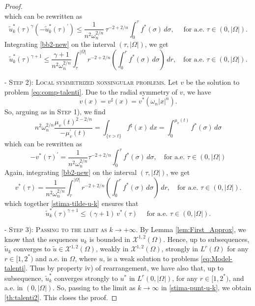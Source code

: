 \documentclass[10pt,a4paper]{amsart}
\def \XX {\mathcal{X}}
\begin{document}
\begin{proof}
$$$$
which can be rewritten as 
\begin{equation}\label{bb2-new}
\tilde{u}_k^\ast(\tau)^\gamma\left(-\tilde{u}_k^\ast(\tau)^{\prime}\right) \leq \frac{1}{n^2 \omega_n^{2 / n}} \,\tau^{-2+2 / n} \int_0^\tau f^\ast(\sigma) \,d\sigma, \quad \text { for a.e. } \tau \in(0,|\Omega|).
\end{equation}
Integrating \eqref{bb2-new} on the interval $(\tau,|\Omega|)$, we get
\begin{equation}\label{stima-tilde-u-k}
\tilde{u}_k^\ast(\tau)^{\gamma+1} \leq \frac{\gamma+1}{n^2 \omega_n^{2 / n}} \int_\tau^{|\Omega|} r^{-2+2 / n}\left(\int_0^r f^\ast(\sigma) \,d \sigma\right) \,d r, \quad\text{for a.e. } \tau\in(0,|\Omega|).
\end{equation}

-\,\,\textsc{Step 2): Local symmetrized nonsingular problems.} Let $v$ be the solution to problem \eqref{eq:comp-talenti}. Due to the radial symmetry of $v$, we have 
$$v(x)=v^\sharp(x)=v^*(\omega_n|x|^n).$$
So, arguing as in \textsc{Step 1)}, we find
\begin{equation*}
n^2 \omega_n^{2 / n} \dfrac{\mu_{v}(t)^{2-2/n}}{-\mu_{v}^{\prime}(t)} =\int_{\{v>t\}} f^\sharp(x)\,d x=\int_0^{\mu_v(t)}f^\ast(\sigma)\, d\sigma
\end{equation*}
which can be rewritten as
$$
-v^\ast(\tau)^{\prime} =\frac{1}{n^2 \omega_n^{2 / n}} \tau^{-2+2 / n} \int_0^\tau f^\ast(\sigma) \,d\sigma, \quad \text {for a.e. } \tau \in(0,|\Omega|)
$$
Again, integrating \eqref{bb2-new} on the interval $(\tau,|\Omega|)$, we get
\begin{equation}\label{eq-v}
v^\ast(\tau)= \frac{1}{n^2 \omega_n^{2 / n}} \int_\tau^{|\Omega|} r^{-2+2 / n}\left(\int_0^r f^\ast(\sigma) \,d \sigma\right) \,d r, \quad\text{for a.e. } \tau\in(0,|\Omega|).
\end{equation}
which together \eqref{stima-tilde-u-k} ensures that 
\begin{equation}\label{stima-punt-u-k}
    \tilde u_k^\ast(\tau)^{\gamma+1}\leq (\gamma+1)\,v^\ast(\tau)\quad \text{ for a.e. }\tau \in(0,|\Omega|).
\end{equation}

-\,\,\textsc{Step 3): Passing to the limit as $k \to +\infty$.} By Lemma \ref{lem:First_Approx}, we know that the sequences $u_k$ is bounded in $\XX^{1,2}(\Omega)$. Hence, up to subsequences, $\tilde u_k$ converges to $\tilde u \in \XX^{1,2}(\Omega)$, weakly in $\XX^{1,2}(\Omega)$, strongly in $L^r(\Omega)$ for any $r\in [1,2^\ast)$ and a.e. in $\Omega$, where $u$, is a weak solution to problems \eqref{eq:Model-talenti}. Thus by property iv) of rearrangement, we have also that, up to subsequence, $\tilde u_k^\ast$ converges strongly to $u^\ast$ in $L^r(0,|\Omega|)$, for any $r\in[1,2^\ast)$, and a.e. in $(0,|\Omega|).$ So, passing to the limit as $k\to\infty$ in \eqref{stima-punt-u-k}, we obtain \eqref{th:talenti2}. This closes the proof.
\end{proof}
\end{document}
